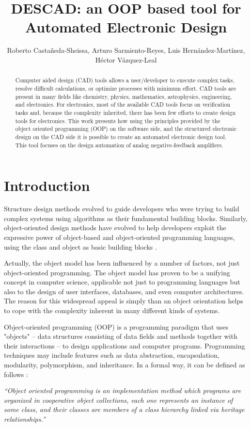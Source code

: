 \documentclass[twocolumn]{IEEEtran}
\begin{document}
\title{DESCAD: an OOP based tool for Automated Electronic Design}
\author{Roberto Casta\~neda-Sheissa, Arturo Sarmiento-Reyes, Luis Hern\'andez-Mart\'inez, H\'ector V\'azquez-Leal}

\maketitle
\thispagestyle{empty}
\pagestyle{empty}
\begin{abstract}
Computer aided design (CAD) tools allows a user/developer to execute complex tasks, resolve difficult calculations, or optimize processes with minimum effort. CAD tools are present in many fields like chemistry, physics, mathematics, astrophysics, engineering, and electronics. For electronics, most of the available CAD tools focus on verification tasks and, because the complexity inherited, there has been few efforts to create design tools for electronics. This work presents how using the principles provided by the object oriented programming (OOP) on the software side, and the structured electronic design on the CAD side it is possible to create an automated electronic design tool. This tool focuses on the design automation of analog negative-feedback amplifiers.
\end{abstract}

\section{Introduction}
Structure design methods evolved to guide developers who were trying to build complex systems using algorithms as their fundamental building blocks. Similarly, object-oriented design methods have evolved to help developers exploit the expressive power of object-based and object-oriented programming languages, using the class and object as basic building blocks \cite{booch}.

Actually, the object model has been influenced by a number of factors, not just object-oriented programming. The object model has proven to be a unifying concept in computer science, applicable not just to programming languages but also to the design of user interfaces, databases, and even computer architectures. The reason for this widespread appeal is simply than an object orientation helps to cope with the complexity inherent in many different kinds of systems.

Object-oriented programming (OOP) is a programming paradigm that uses "objects" – data structures consisting of data fields and methods together with their interactions – to design applications and computer programs. Programming techniques may include features such as data abstraction, encapsulation, modularity, polymorphism, and inheritance. In a formal way, it can be defined as follows \cite{booch}:
\begin{description}
\item{\it ``Object oriented programming is an implementation method which programs are organized in cooperative object collections, each one represents an instance of some class, and their classes are members of a class hierarchy linked via heritage relationships.''}
 \end{description}
\end{document}
